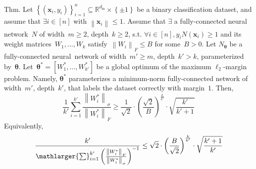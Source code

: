 \documentclass[handout,usenames,dvipsnames]{beamer} %
\newcommand{\din}{{d_{\text{in}}}}
\newcommand{\norm}[2][]{{\left\|{#2}\right\|_{#1}}}
\newcommand{\set}[1]{\left\{{#1}\right\}}
\newcommand{\bx}{\mathbf{x}}
\newcommand{\btheta}{{\boldsymbol{\theta}}}
\begin{document}
\begin{frame}
    \begin{exampleblock}{Thm. \hfill\checkmark}
        \setlength{\abovedisplayskip}{0pt}
        \setlength{\belowdisplayskip}{0pt}
        \pause
        Let $\left\{ \left( \bx_i, y_i \right) \right\}_{i=1}^n \subseteq \mathbb{R}^{\din} \times \set{\pm 1}$ be a binary classification dataset, and assume that $\exists i \in [n]$ with $\norm{\bx_i} \leq 1$. 
        \pause
        Assume that $\exists$ a fully-connected neural network~$N$ of width~$m \geq 2$, depth~$k \geq 2$, s.t. $\forall i \in [n], y_i N(\bx_i) \geq 1$ and its weight matrices~$W_1,\ldots,W_k$ satisfy~$\norm{W_i}_F \leq B$ for some~$B>0$.
        \pause
        Let $N_\btheta$ be a fully-connected neural~network of width~$m' \geq m$, depth~$k' > k$, parameterized by~$\btheta$. 
        \pause
        Let~$\btheta^* = \left[W_1^*,\ldots,W_{k'}^*\right]$ be a global optimum of the maximum $\ell_2$-margin problem. Namely, $\btheta^*$ parameterizes a minimum-norm fully-connected network of width~$m'$, depth~$k'$, that labels the dataset correctly with margin~$1$.
        \pause
        Then,
        \begin{equation*} \label{eq:average ratio exp}
            \frac{1}{k'} \sum_{i=1}^{k'} \frac{\norm{W_i^*}_\sigma}{\norm{W_i^*}_F} \geq \frac{1}{\sqrt{2}} \cdot \left( \frac{\sqrt{2}}{B} \right)^{\frac{k}{k'}} \cdot \sqrt{\frac{k'}{k'+1}}
        \end{equation*}
        \pause
        Equivalently, 
        \begin{equation*} \label{eq:harmonic ratio exp}
            \frac{k'}{\mathlarger{\sum}_{i=1}^{k'} \left( \frac{\norm{W_i^*}_F}{\norm{W_i^*}_\sigma} \right)^{-1}}
            \leq \sqrt{2} \cdot \left( \frac{B}{\sqrt{2}} \right)^{\frac{k}{k'}} \cdot \sqrt{\frac{k'+1}{k'}}
        \end{equation*}
    \end{exampleblock}
    

\end{frame}
\end{document}

